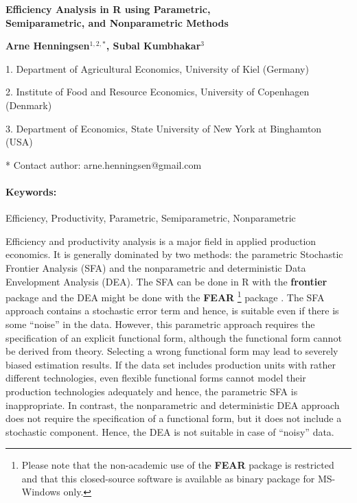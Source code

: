 \documentclass[10pt]{article}
\renewcommand{\title}[1]{\begin{center}{\bf \LARGE #1}\end{center}}
\newcommand{\keywords}{\paragraph{Keywords:}}
\begin{document}
\pagestyle{empty}

\title{Efficiency Analysis in \textsf{R} using Parametric,\\[3mm]
Semiparametric, and Nonparametric Methods}

\begin{center}
  {\bf Arne Henningsen$^{1,2,*}$, Subal Kumbhakar$^{3}$}
\end{center}

\begin{affiliations}
1. Department of Agricultural Economics, University of Kiel (Germany)\par
2. Institute of Food and Resource Economics, University of Copenhagen (Denmark)\par
3. Department of Economics, State University of New York at Binghamton (USA)\par
* Contact author: arne.henningsen@gmail.com
\end{affiliations}

\keywords Efficiency, Productivity, Parametric, Semiparametric, Nonparametric

\vskip 0.8cm

Efficiency and productivity analysis is a major field
in applied production economics.
It is generally dominated by two methods:
the parametric Stochastic Frontier Analysis (SFA) and
the nonparametric and deterministic Data Envelopment Analysis (DEA).
The SFA can be done in \textsf{R} with the \textbf{frontier} package
\cite{r-frontier-0.9}
and the DEA might be done with the \textbf{FEAR}%
\footnote{%
Please note that the non-academic use of the \textbf{FEAR} package
is restricted and that this closed-source software
is available as binary package for MS-Windows only.%
}
package \cite{wilson08}.
The SFA approach contains a stochastic error term and hence,
is suitable even if there is some ``noise'' in the data.
However, this parametric approach requires the specification
of an explicit functional form,
although the functional form cannot be derived from theory.
Selecting a wrong functional form may lead to severely biased
estimation results.
If the data set includes production units
with rather different technologies,
even flexible functional forms
cannot model their production technologies adequately
and hence, the parametric SFA is inappropriate.
In contrast, the nonparametric and deterministic DEA approach does not require
the specification of a functional form,
but it does not include a stochastic component.
Hence, the DEA is not suitable in case of ``noisy'' data.
\end{document}
